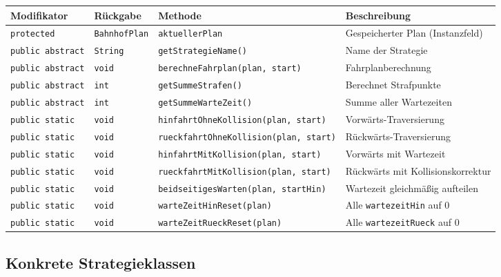 \documentclass[12pt,a4paper]{article}
\begin{document}
\begin{center}
\small
\begin{tabular}{lllp{5.5cm}}
\toprule
\textbf{Modifikator} & \textbf{Rückgabe} & \textbf{Methode} & \textbf{Beschreibung} \\
\midrule
\texttt{protected} & \texttt{BahnhofPlan} & \texttt{aktuellerPlan} & Gespeicherter Plan (Instanzfeld) \\
\midrule
\texttt{public abstract} & \texttt{String} & \texttt{getStrategieName()} & Name der Strategie \\
\texttt{public abstract} & \texttt{void} & \texttt{berechneFahrplan(plan, start)} & Fahrplanberechnung \\
\texttt{public abstract} & \texttt{int} & \texttt{getSummeStrafen()} & Berechnet Strafpunkte \\
\texttt{public abstract} & \texttt{int} & \texttt{getSummeWarteZeit()} & Summe aller Wartezeiten \\
\midrule
\texttt{public static} & \texttt{void} & \texttt{hinfahrtOhneKollision(plan, start)} & Vorwärts-Traversierung \\
\texttt{public static} & \texttt{void} & \texttt{rueckfahrtOhneKollision(plan, start)} & Rückwärts-Traversierung \\
\texttt{public static} & \texttt{void} & \texttt{hinfahrtMitKollision(plan, start)} & Vorwärts mit Wartezeit \\
\texttt{public static} & \texttt{void} & \texttt{rueckfahrtMitKollision(plan, start)} & Rückwärts mit Kollisionskorrektur \\
\texttt{public static} & \texttt{void} & \texttt{beidseitigesWarten(plan, startHin)} & Wartezeit gleichmäßig aufteilen \\
\texttt{public static} & \texttt{void} & \texttt{warteZeitHinReset(plan)} & Alle \texttt{wartezeitHin} auf 0 \\
\texttt{public static} & \texttt{void} & \texttt{warteZeitRueckReset(plan)} & Alle \texttt{wartezeitRueck} auf 0 \\
\bottomrule
\end{tabular}
\end{center}

\subsection{Konkrete Strategieklassen}
\end{document}

